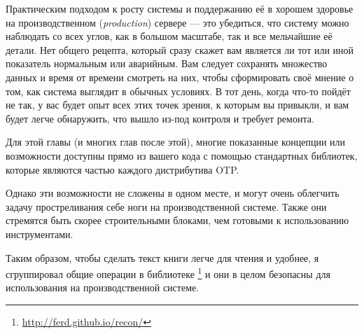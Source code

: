 \documentclass[11pt, oneside]{book}   	%
\begin{document}
Практическим подходом к росту системы и поддержанию её в хорошем здоровье на производственном (\emph{production}) сервере --- это убедиться, что систему можно наблюдать со всех углов, как в большом масштабе, так и все мельчайшие её детали. Нет общего рецепта, который сразу скажет вам является ли тот или иной показатель нормальным или аварийным. Вам следует сохранять множество данных и время от времени смотреть на них, чтобы сформировать своё мнение о том, как система выглядит в обычных условиях. В тот день, когда что-то пойдёт не так, у вас будет опыт всех этих точек зрения, к которым вы привыкли, и вам будет легче обнаружить, что вышло из-под контроля и требует ремонта.

Для этой главы (и многих глав после этой), многие показанные концепции или возможности доступны прямо из вашего кода с помощью стандартных библиотек, которые являются частью каждого дистрибутива OTP.

Однако эти возможности не сложены в одном месте, и могут очень облегчить задачу простреливания себе ноги на производственной системе. Также они стремятся быть скорее строительными блоками, чем готовыми к использованию инструментами.

Таким образом, чтобы сделать текст книги легче для чтения и удобнее, я сгруппировал общие операции в библиотеке \footnote{\href{http://ferd.github.io/recon/}{http://ferd.github.io/recon/}} и они в целом безопасны для использования на производственной системе.
\end{document}

